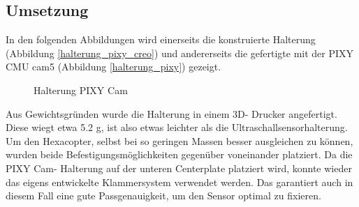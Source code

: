 	\subsection{Umsetzung}

	In den folgenden Abbildungen wird einerseits die konstruierte Halterung (Abbildung \ref{halterung_pixy_creo})
	und andererseits die gefertigte  mit der PIXY CMU cam5 (Abbildung \ref{halterung_pixy}) gezeigt.

			\begin{figure}[thb]
				\begin{centering}
				\par\end{centering}
				\caption{Halterung PIXY Cam}
				\label{Halterung_PIXY}
			\end{figure}

	Aus Gewichtsgründen wurde die Halterung in einem 3D- Drucker angefertigt.
	Diese wiegt etwa 5.2 g, ist also etwas leichter als die Ultraschallsensorhalterung.
	Um den Hexacopter, selbst bei so geringen Massen besser ausgleichen zu können, wurden beide Befestigungsmöglichkeiten gegenüber voneinander platziert.
	Da die PIXY Cam- Halterung auf der unteren Centerplate platziert wird, konnte wieder das eigens entwickelte Klammersystem verwendet werden.
	Das garantiert auch in diesem Fall eine gute Passgenauigkeit, um den Sensor optimal zu fixieren.

